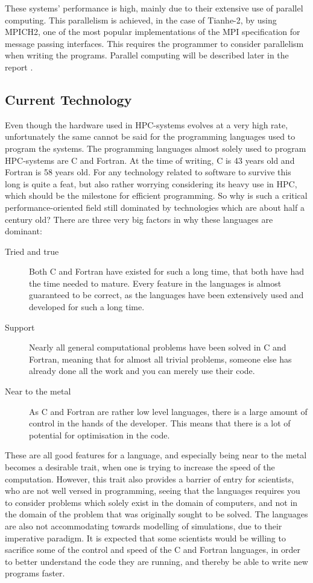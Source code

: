These systems' performance is high, mainly due to their extensive use of parallel computing. This parallelism is achieved, in the case of Tianhe-2, by using MPICH2, one of the most popular implementations of the MPI specification for message passing interfaces. This requires the programmer to consider parallelism when writing the programs. Parallel computing will be described later in the report .


\subsection{Current Technology}

Even though the hardware used in HPC-systems evolves at a very high rate, unfortunately the same cannot be said for the programming languages used to program the systems. The programming languages almost solely used to program HPC-systems are C and Fortran. At the time of writing, C is 43 years old and Fortran is 58 years old. For any technology related to software to survive this long is quite a feat, but also rather worrying considering its heavy use in HPC, which should be the milestone for efficient programming.
So why is such a critical performance-oriented field still dominated by technologies which are about half a century old? There are three very big factors in why these languages are dominant:

\begin{description}
	\item [Tried and true]
	Both C and Fortran have existed for such a long time, that both have had the time needed to mature. Every feature in the languages is almost guaranteed to be correct, as the languages have been extensively used and developed for such a long time.
	\item [Support]
	Nearly all general computational problems have been solved in C and Fortran, meaning that for almost all trivial problems, someone else has already done all the work and you can merely use their code.
	\item [Near to the metal]
	As C and Fortran are rather low level languages, there is a large amount of control in the hands of the developer. This means that there is a lot of potential for optimisation in the code.
\end{description}

These are all good features for a language, and especially being near to the metal becomes a desirable trait, when one is trying to increase the speed of the computation. However, this trait also provides a barrier of entry for scientists, who are not well versed in programming, seeing that the languages requires you to consider problems which solely exist in the domain of computers, and not in the domain of the problem that was originally sought to be solved. The languages are also not accommodating towards modelling of simulations, due to their imperative paradigm. It is expected that some scientists would be willing to sacrifice some of the control and speed of the C and Fortran languages, in order to better understand the code they are running, and thereby be able to write new programs faster.
